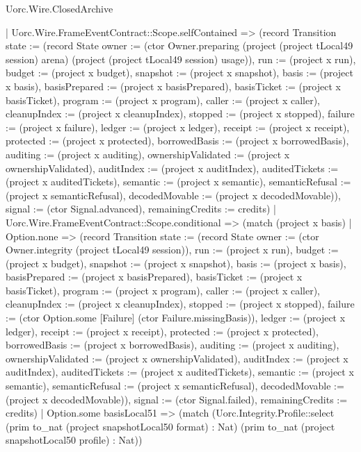 \begin{lexlean}{Uorc.Wire.ClosedArchive}
\begin{semanticmodule}
{        | Uorc.Wire.FrameEventContract::Scope.selfContained => (record Transition {state := (record State {owner := (ctor Owner.preparing (project (project tLocal49 session) arena) (project (project tLocal49 session) usage)), run := (project x run), budget := (project x budget), snapshot := (project x snapshot), basis := (project x basis), basisPrepared := (project x basisPrepared), basisTicket := (project x basisTicket), program := (project x program), caller := (project x caller), cleanupIndex := (project x cleanupIndex), stopped := (project x stopped), failure := (project x failure), ledger := (project x ledger), receipt := (project x receipt), protected := (project x protected), borrowedBasis := (project x borrowedBasis), auditing := (project x auditing), ownershipValidated := (project x ownershipValidated), auditIndex := (project x auditIndex), auditedTickets := (project x auditedTickets), semantic := (project x semantic), semanticRefusal := (project x semanticRefusal), decodedMovable := (project x decodedMovable)}), signal := (ctor Signal.advanced), remainingCredits := credits})
        | Uorc.Wire.FrameEventContract::Scope.conditional => (match (project x basis)
          | Option.none => (record Transition {state := (record State {owner := (ctor Owner.integrity (project tLocal49 session)), run := (project x run), budget := (project x budget), snapshot := (project x snapshot), basis := (project x basis), basisPrepared := (project x basisPrepared), basisTicket := (project x basisTicket), program := (project x program), caller := (project x caller), cleanupIndex := (project x cleanupIndex), stopped := (project x stopped), failure := (ctor Option.some [Failure] (ctor Failure.missingBasis)), ledger := (project x ledger), receipt := (project x receipt), protected := (project x protected), borrowedBasis := (project x borrowedBasis), auditing := (project x auditing), ownershipValidated := (project x ownershipValidated), auditIndex := (project x auditIndex), auditedTickets := (project x auditedTickets), semantic := (project x semantic), semanticRefusal := (project x semanticRefusal), decodedMovable := (project x decodedMovable)}), signal := (ctor Signal.failed), remainingCredits := credits})
          | Option.some basisLocal51 => (match (Uorc.Integrity.Profile::select (prim to_nat (project snapshotLocal50 format) : Nat) (prim to_nat (project snapshotLocal50 profile) : Nat))
}
\end{semanticmodule}
\end{lexlean}
